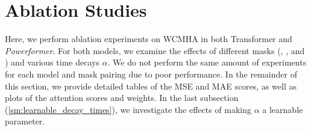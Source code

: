 \section{Ablation Studies}
\label{sm:ablation}

Here, we perform ablation experiments on WCMHA in both Transformer and \emph{Powerformer}.
For both models, we examine the effects of different masks (\fpl, \fspl, and \fbwn) and various time decays $\alpha$.
We do not perform the same amount of experiments for each model and mask pairing due to poor performance.
In the remainder of this section, we provide detailed tables of the MSE and MAE scores, as well as plots of the attention scores and weights.
In the last subsection (\ref{sm:learnable_decay_times}), we investigate the effects of making $\alpha$ a learnable parameter.




